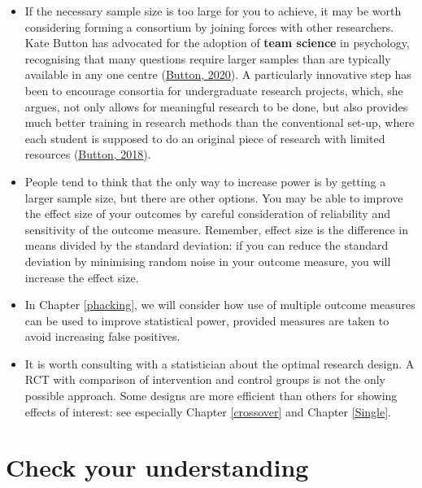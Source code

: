 \documentclass{krantz}
\providecommand{\tightlist}{%
\setlength{\itemsep}{0pt}\setlength{\parskip}{0pt}}
\begin{document}
\begin{itemize}
\tightlist
\item
  If the necessary sample size is too large for you to achieve, it may be worth considering forming a consortium by joining forces with other researchers. Kate Button has advocated for the adoption of \textbf{team science} in psychology, recognising that many questions require larger samples than are typically available in any one centre (\protect\hyperlink{ref-button2020}{Button, 2020}). A particularly innovative step has been to encourage consortia for undergraduate research projects, which, she argues, not only allows for meaningful research to be done, but also provides much better training in research methods than the conventional set-up, where each student is supposed to do an original piece of research with limited resources (\protect\hyperlink{ref-button2018}{Button, 2018}).\\
\item
  People tend to think that the only way to increase power is by getting a larger sample size, but there are other options. You may be able to improve the effect size of your outcomes by careful consideration of reliability and sensitivity of the outcome measure. Remember, effect size is the difference in means divided by the standard deviation: if you can reduce the standard deviation by minimising random noise in your outcome measure, you will increase the effect size.\\
\item
  In Chapter \ref{phacking}, we will consider how use of multiple outcome measures can be used to improve statistical power, provided measures are taken to avoid increasing false positives.
\item
  It is worth consulting with a statistician about the optimal research design. A RCT with comparison of intervention and control groups is not the only possible approach. Some designs are more efficient than others for showing effects of interest: see especially Chapter \ref{crossover} and Chapter \ref{Single}.
\end{itemize}

\hypertarget{check-your-understanding-12}{%
\section{Check your understanding}\label{check-your-understanding-12}}
\end{document}
